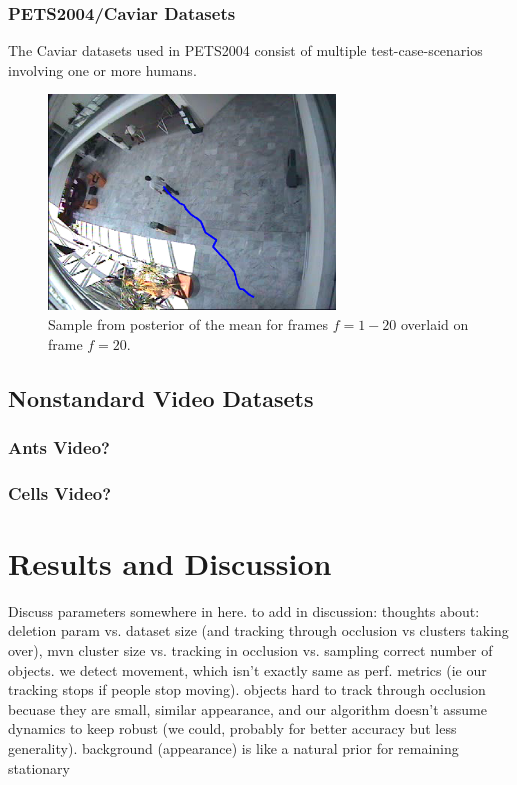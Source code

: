 \documentclass[smallcondensed, final]{svjour3}
\begin{document}
\subsubsection{PETS2004/Caviar Datasets}

The Caviar datasets used in PETS2004 consist of multiple test-case-scenarios involving one or more humans.


\begin{figure}
	\centering
	\includegraphics[width=3in]{../img/pets2004_results_1}
	\caption{Sample from posterior of the mean for frames $f = 1-20$ overlaid on frame $f=20$.}
	\label{fig:pets2009_results}
\end{figure}



\subsection{Nonstandard Video Datasets}

\subsubsection{Ants Video?}

\subsubsection{Cells Video?}




\section*{Results and Discussion}

Discuss parameters somewhere in here. to add in discussion: thoughts about: deletion param vs. dataset size (and tracking through occlusion vs clusters taking over), mvn cluster size vs. tracking in occlusion vs. sampling correct number of objects.  we detect movement, which isn’t exactly same as perf. metrics (ie our tracking stops if people stop moving). objects hard to track through occlusion becuase they are small, similar appearance, and our algorithm doesn’t assume dynamics to keep robust (we could, probably for better accuracy but less generality). background (appearance) is like a natural prior for remaining stationary
\end{document}
